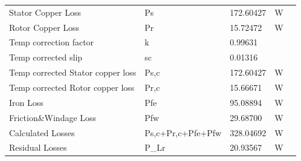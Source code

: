\begin{table}[]
\begin{tabular}{
    >{\columncolor[HTML]{9B9B9B}}l llll}
    Stator   Copper Loss                                & \cellcolor[HTML]{F2F2F2}Ps                & \cellcolor[HTML]{F2F2F2}172.60427 & \cellcolor[HTML]{F2F2F2}W    &  \\
    Rotor   Copper Loss                                 & Pr                                        & 15.72472                          & W                            &  \\
    Temp   correction factor                            & \cellcolor[HTML]{F2F2F2}k                 & \cellcolor[HTML]{F2F2F2}0.99631   & \cellcolor[HTML]{F2F2F2}     &  \\
    Temp   corrected slip                               & sc                                        & 0.01316                           &                              &  \\
    Temp   corrected Stator copper loss                 & \cellcolor[HTML]{F2F2F2}Ps,c              & \cellcolor[HTML]{F2F2F2}172.60427 & \cellcolor[HTML]{F2F2F2}W    &  \\
    Temp   corrected Rotor copper loss                  & Pr,c                                      & 15.66671                          & W                            &  \\
    Iron Loss                                           & \cellcolor[HTML]{F2F2F2}Pfe               & \cellcolor[HTML]{F2F2F2}95.08894 & \cellcolor[HTML]{F2F2F2}W    &  \\
    Friction\&Windage   Loss                            & Pfw                                       & 29.68700                          & W                            &  \\
    Calculated   Losses                                 & \cellcolor[HTML]{F2F2F2}Ps,c+Pr,c+Pfe+Pfw & \cellcolor[HTML]{F2F2F2}328.04692 & \cellcolor[HTML]{F2F2F2}W    &  \\
    Residual   Losses                                   & P\_Lr                                     & 20.93567                          & W                            & 
\end{tabular}
\end{table}

